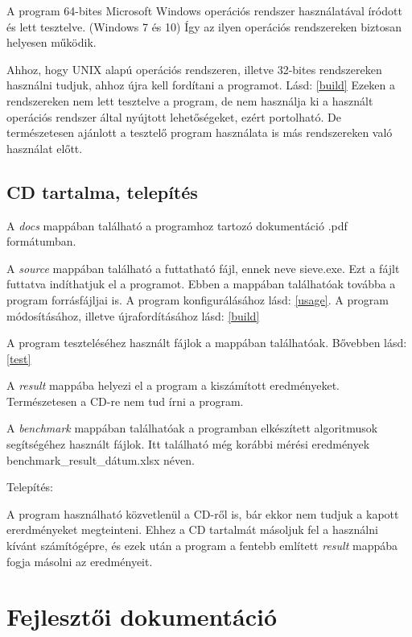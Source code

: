 \documentclass[twoside, a4paper, 12pt]{article}
\begin{document}
A program 64-bites Microsoft Windows operációs rendszer használatával íródott és lett tesztelve. (Windows 7 és 10) Így az ilyen operációs rendszereken biztosan helyesen működik. \par
Ahhoz, hogy UNIX alapú operációs rendszeren, illetve 32-bites rendszereken használni tudjuk, ahhoz újra kell fordítani a programot. Lásd: \ref{build} Ezeken a rendszereken nem lett tesztelve a program, de nem használja ki a használt operációs rendszer által nyújtott lehetőségeket, ezért portolható. De természetesen ajánlott a tesztelő program használata is más rendszereken való használat előtt.

\subsection{CD tartalma, telepítés}

A \textit{docs} mappában található a programhoz tartozó dokumentáció .pdf formátumban. \par
A \textit{source} mappában található a futtatható fájl, ennek neve sieve.exe. Ezt a fájlt futtatva indíthatjuk el a programot. Ebben a mappában találhatóak továbba a program forrásfájljai is.  A program konfigurálásához lásd: \ref{usage}. A program módosításához, illetve újrafordításához lásd: \ref{build} \par
A program teszteléséhez használt fájlok a  mappában találhatóak. Bővebben lásd: \ref{test} \par
A \textit{result} mappába helyezi el a program a kiszámított eredményeket. Természetesen a CD-re nem tud írni a program. \par
A \textit{benchmark} mappában találhatóak a programban elkészített algoritmusok segítségéhez használt fájlok. Itt található még korábbi mérési eredmények benchmark_result_dátum.xlsx néven. \par \par

Telepítés: \par
A program használható közvetlenül a CD-ről is, bár ekkor nem tudjuk a kapott ererdményeket megteinteni. Ehhez a CD tartalmát másoljuk fel a használni kívánt számítógépre, és ezek után a program a fentebb említett \textit{result} mappába fogja másolni az eredményeit.

\clearpage
\section{Fejlesztői dokumentáció}
\end{document}
